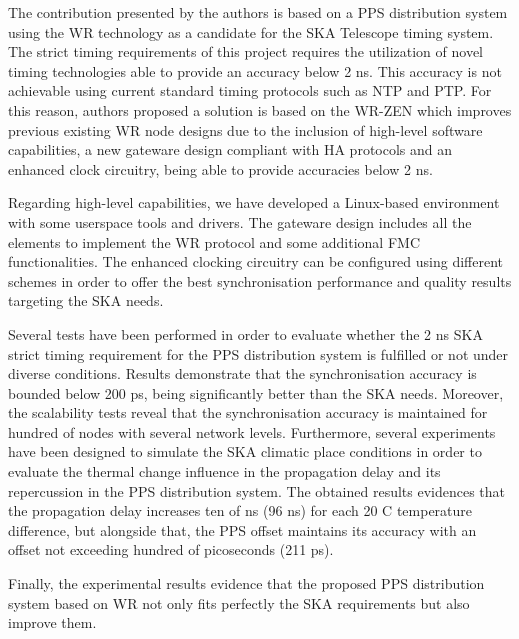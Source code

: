 The contribution presented by the authors is based on a PPS distribution system using the WR technology as a candidate for the SKA Telescope timing system. The strict timing requirements of this project requires the utilization of novel timing technologies able to provide an accuracy below 2 ns. This accuracy is not achievable using current standard timing protocols such as NTP and PTP.
For this reason, authors proposed a solution is based on the WR-ZEN which improves previous existing WR node designs 
due to the inclusion of high-level software capabilities, a new gateware design compliant with HA protocols and an enhanced clock circuitry, being able to provide accuracies below 2 ns.

Regarding high-level capabilities, we have developed a Linux-based environment with some
userspace tools and drivers. The gateware design includes all the elements to implement the 
WR protocol and some additional FMC functionalities. The enhanced clocking circuitry can be configured using different schemes in order to offer the best synchronisation performance and quality results targeting the SKA needs. 

Several tests have been performed in order to evaluate whether the 2 ns SKA strict timing requirement for the PPS distribution system is fulfilled or not under diverse conditions.
Results demonstrate that the synchronisation accuracy is bounded below 200 ps, being significantly better than the SKA needs. Moreover, the scalability tests reveal that the synchronisation accuracy is maintained for hundred of nodes with several network levels. 
Furthermore, several experiments have been designed to simulate the SKA climatic place conditions 
in order to evaluate the thermal change influence in the propagation delay 
and its repercussion in the PPS distribution system. The obtained results evidences that the propagation delay increases ten of ns (96 ns) for each 20 C temperature difference, but alongside that, the PPS offset maintains its accuracy with an offset not exceeding hundred of picoseconds (211 ps). 

Finally, the experimental results evidence that the proposed PPS distribution system based on WR not only fits perfectly the SKA requirements but also improve them.


